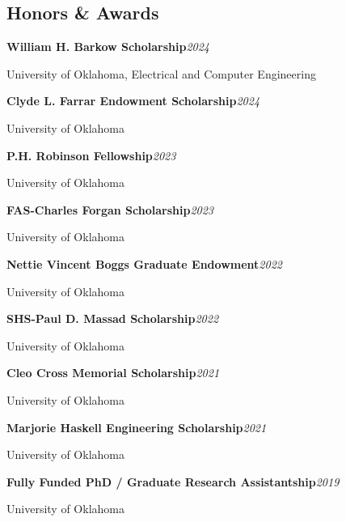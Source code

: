 \documentclass[10pt,letterpaper]{extarticle}
\newcommand{\entry}[2]{\Needspace{4\baselineskip}\textbf{#1}\hfill\textit{#2}\par}
\begin{document}
\subsection{Honors \& Awards}
\entry{William H. Barkow Scholarship}{2024}
{\small University of Oklahoma, Electrical and Computer Engineering\par}
\entry{Clyde L. Farrar Endowment Scholarship}{2024}
{\small University of Oklahoma\par}
\entry{P.H. Robinson Fellowship}{2023}
{\small University of Oklahoma\par}
\entry{FAS-Charles Forgan Scholarship}{2023}
{\small University of Oklahoma\par}
\entry{Nettie Vincent Boggs Graduate Endowment}{2022}
{\small University of Oklahoma\par}
\entry{SHS-Paul D. Massad Scholarship}{2022}
{\small University of Oklahoma\par}
\entry{Cleo Cross Memorial Scholarship}{2021}
{\small University of Oklahoma\par}
\entry{Marjorie Haskell Engineering Scholarship}{2021}
{\small University of Oklahoma\par}
\entry{Fully Funded PhD / Graduate Research Assistantship}{2019}
{\small University of Oklahoma\par}
\end{document}
